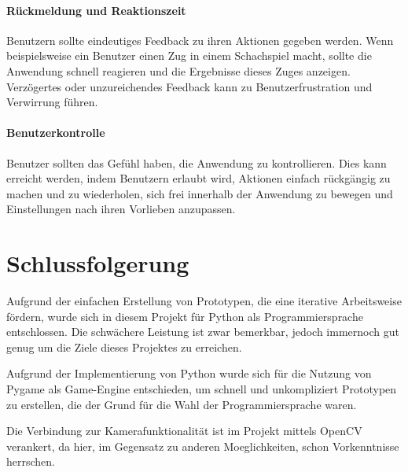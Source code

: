 \paragraph{Rückmeldung und Reaktionszeit}
Benutzern sollte eindeutiges Feedback zu ihren Aktionen gegeben werden. 
Wenn beispielsweise ein Benutzer einen Zug in einem Schachspiel macht, sollte die Anwendung schnell reagieren und die Ergebnisse dieses Zuges anzeigen. 
Verzögertes oder unzureichendes Feedback kann zu Benutzerfrustration und Verwirrung führen.~\cite{Uxpin_2022_uxpin}

\paragraph{Benutzerkontrolle}
Benutzer sollten das Gefühl haben, die Anwendung zu kontrollieren. Dies kann erreicht werden, indem Benutzern erlaubt wird, 
Aktionen einfach rückgängig zu machen und zu wiederholen, sich frei innerhalb der Anwendung zu bewegen und 
Einstellungen nach ihren Vorlieben anzupassen.~\cite{Uxpin_2022_uxpin}

\section{Schlussfolgerung}
Aufgrund der einfachen Erstellung von Prototypen, die eine iterative Arbeitsweise fördern, 
wurde sich in diesem Projekt für Python als Programmiersprache entschlossen. Die schwächere Leistung ist zwar bemerkbar, jedoch immernoch 
gut genug um die Ziele dieses Projektes zu erreichen.

Aufgrund der Implementierung von Python wurde sich für die Nutzung von Pygame als Game-Engine entschieden, um schnell und unkompliziert 
Prototypen zu erstellen, die der Grund für die Wahl der Programmiersprache waren.

Die Verbindung zur Kamerafunktionalität ist im Projekt mittels OpenCV verankert, da hier, im Gegensatz zu anderen Moeglichkeiten, schon Vorkenntnisse 
herrschen.

